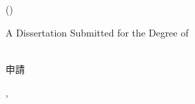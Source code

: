 \begin{titlepage}
    \begin{center}
        \begingroup
        \vspace*{2mm}
				\Large \thesisType\\
        \vspace{2mm}
				\Large \begin{CJK}{UTF8}{ipxm}{\thesisTypeJP}\end{CJK}
        \endgroup

        \vfill

        \begingroup
				\Large \myTitle\\
        \vspace{2mm}
				\Large \begin{CJK}{UTF8}{ipxm}(\myTitleJP)\end{CJK}
        \endgroup

        \vfill
        \vfill

        \begingroup
				\large A Dissertation Submitted for the Degree of {\myDegree}\\
				\large {\myTime}\\
        \vspace{2mm}
				\large \begin{CJK}{UTF8}{ipxm}{\myTimeJP}{\myDegreeJP}申請\end{CJK}
        \endgroup

        \vfill

        \begingroup
        \large \myDepartment, \myFaculty \\
        \myUni \\
        \vspace{2mm}
				\large \begin{CJK}{UTF8}{ipxm}{\myDepFacUniJP}\end{CJK}
        \endgroup

        \vfill

        \begingroup
        \large \myName\\
        \vspace{2mm}
				\large \begin{CJK}{UTF8}{ipxm}{\myNameJP}\end{CJK}
        \vspace{5mm}
        \endgroup


    \end{center}
\end{titlepage}
